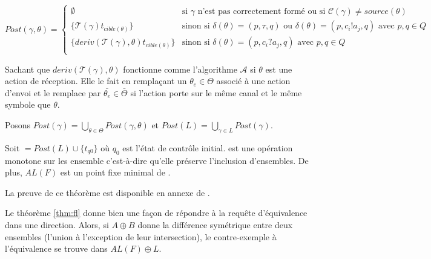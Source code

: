$$
Post(\gamma,\theta) = \left\{ \begin{array}{ll}
    \emptyset & \text{si } \gamma \text{ n'est pas correctement formé ou si } \mathcal{C}(\gamma)\neq source(\theta)\\
    \{\mathcal{T}(\gamma)t_{cible(\theta)}\} & \text{sinon si }\delta(\theta)=(p,\tau,q) \text{ ou } \delta(\theta)=(p,c_i!a_j,q) \text{ avec }p,q\in Q\\
    \{deriv(\mathcal{T}(\gamma),\theta)t_{cible(\theta)}\}& \text{sinon si } \delta(\theta)=(p,c_i?a_j,q) \text{ avec }p,q\in Q \\
    \end{array} \right.
$$

Sachant que $deriv(\mathcal{T}(\gamma),\theta)$ fonctionne comme l'algorithme $\mathcal{A}$ si $\theta$ est une action de réception. Elle le fait en remplaçant un $\theta_e \in \Theta$ associé à une action d'envoi et le remplace par $\bar{\theta_e} \in \bar{\Theta}$ si l'action porte sur le même canal et le même symbole que $\theta$.

Posons $Post(\gamma)=\bigcup_{\theta\in\Theta}Post(\gamma,\theta)$ et $Post(L)=\bigcup_{\gamma\in L}Post(\gamma)$.


\begin{theorem}\label{thm:fl}
  Soit \fl$=Post(L)\cup\{t_{q0}\}$ où $q_0$ est l'état de contrôle initial. \fl est une opération monotone sur les ensemble c'est-à-dire qu'elle préserve l'inclusion d'ensembles. De plus, $AL(F)$ est un point fixe minimal de \fl.
\end{theorem}

La preuve de ce théorème est disponible en annexe de \cite{Vardhan04}.

Le théorème \ref{thm:fl} donne bien une façon de répondre à la requête d'équivalence dans une direction. Alors, si $A\oplus B$ donne la différence symétrique entre deux ensembles (l'union à l'exception de leur intersection), le contre-exemple à l'équivalence se trouve dans $AL(F)\oplus L$.

